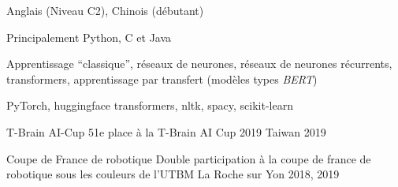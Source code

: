 \documentclass[12pt, a4paper]{awesome-cv}
\begin{document}
\newpage


\begin{cvskills}
  {Anglais (Niveau C2), Chinois (débutant)}
  
  {Principalement Python, C et Java}

  {Apprentissage ``classique'', réseaux de neurones, réseaux de neurones récurrents, transformers, apprentissage par transfert (modèles types \textit{BERT})}

  {PyTorch, huggingface transformers, nltk, spacy, scikit-learn}
\end{cvskills}



\begin{cvhonors}
  \cvhonor
  {T-Brain AI-Cup}
  {51e place à la T-Brain AI Cup 2019}
  {Taiwan}
  {2019}
  
  \cvhonor
  {Coupe de France de robotique}
  {Double participation à la coupe de france de robotique sous les couleurs de l'UTBM}
  {La Roche sur Yon}
  {2018, 2019}
\end{cvhonors}


\end{document}
